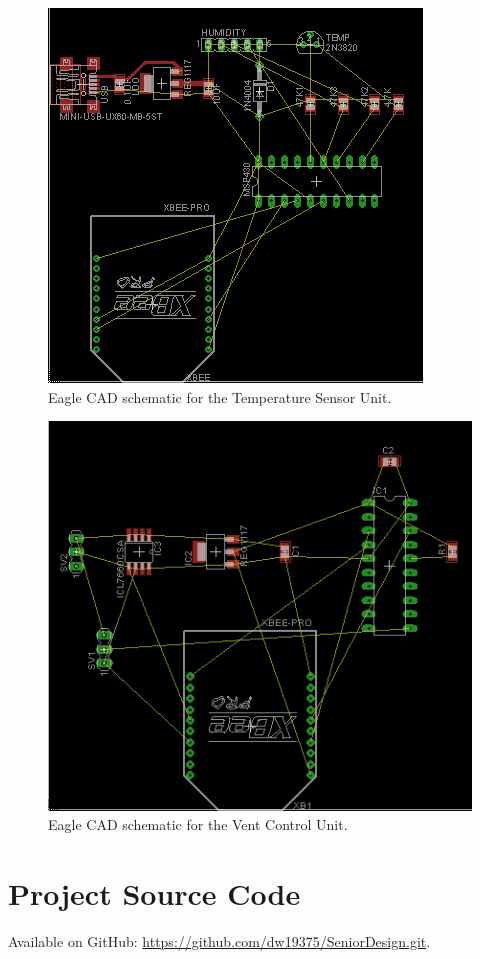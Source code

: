 \begin{figure}[htb]
\centering
\includegraphics[width=.99\textwidth]{Temp_pcb_layout.png}
\caption{Eagle CAD schematic for the Temperature Sensor Unit.}
\label{fig:Temperature_PCB}
\end{figure}

\begin{figure}[htb]
\centering
\includegraphics[width=.99\textwidth]{Vent_pcb_layout.png}
\caption{Eagle CAD schematic for the Vent Control Unit.}
\label{fig:Vent_PCB}
\end{figure}

\section{Project Source Code}
Available on GitHub: \url{https://github.com/dw19375/SeniorDesign.git}.
